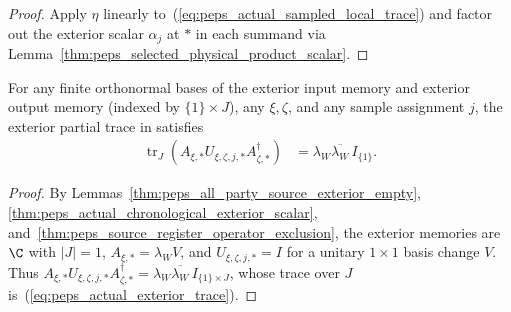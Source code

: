\begin{proof}
    \leanok
    Apply $\eta$ linearly to~(\ref{eq:peps_actual_sampled_local_trace}) and
    factor out the exterior scalar $\alpha_j$ at $*$ in each summand via
    Lemma~\ref{thm:peps_selected_physical_product_scalar}.
\end{proof}

\begin{lemma}
    \label{thm:peps_actual_sampled_exterior_trace}
    \leanok
    For any finite orthonormal bases of the exterior input memory and exterior
    output memory (indexed by $\{1\}\times J$), any $\xi,\zeta$, and any sample
    assignment $j$, the exterior partial trace in
    \cite[proof of Theorem~5.2]{OpenAI2026PolynomialPEPS} satisfies
    \begin{align}
        \operatorname{tr}_{J}
        \left(A_{\xi,*}U_{\xi,\zeta,j,*}A_{\zeta,*}^\dagger\right)
         & =\lambda_W\overline{\lambda_W}\,I_{\{1\}}.
        \label{eq:peps_actual_exterior_trace}
    \end{align}
\end{lemma}

\begin{proof}
    \leanok
    By Lemmas~\ref{thm:peps_all_party_source_exterior_empty},
    \ref{thm:peps_actual_chronological_exterior_scalar},
    and~\ref{thm:peps_source_register_operator_exclusion}, the exterior memories
    are $\C$ with $|J|=1$, $A_{\xi,*}=\lambda_W V$, and $U_{\xi,\zeta,j,*}=I$
    for a unitary $1\times 1$ basis change $V$. Thus
    $A_{\xi,*}U_{\xi,\zeta,j,*}A_{\zeta,*}^\dagger=\lambda_W\overline{\lambda_W}\,I_{\{1\}\times J}$,
    whose trace over $J$ is~(\ref{eq:peps_actual_exterior_trace}).
\end{proof}

